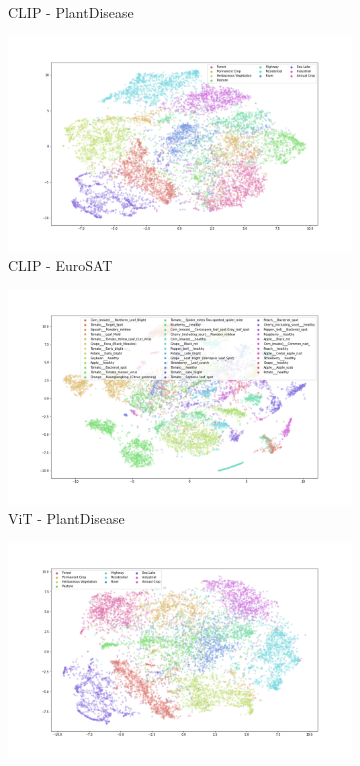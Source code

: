 \documentclass{article}
\theoremstyle{definition}
\begin{document}
\begin{figure}[h!]
\begin{subfigure}{.48\textwidth}
        \caption{CLIP - PlantDisease}
    \end{subfigure}
    \begin{subfigure}{.48\textwidth}
        \includegraphics[width=\linewidth]{Final project/img/EuroSAT_clip-vit-base-patch32.png}
        \caption{CLIP - EuroSAT}
    \end{subfigure}
    \begin{subfigure}{.48\textwidth}
        \includegraphics[width=\linewidth]{Final project/img/PlantDisease_clip-vit-base-patch32.png}
        \caption{ViT - PlantDisease}
    \end{subfigure}
    \begin{subfigure}{.48\textwidth}
        \includegraphics[width=\linewidth]{Final project/img/EuroSAT_vit-base-patch32-384.png}

\end{subfigure}
\end{figure}
\end{document}
